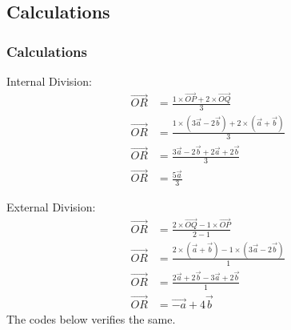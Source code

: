 \documentclass{beamer}
\theoremstyle{remark}
\numberwithin{equation}{section}
\begin{document}
	\subsection{Calculations}
	\begin{frame}
		\frametitle{Calculations}
		Internal Division:
		\begin{align}
			\overrightarrow{OR} &= \frac{1 \times \overrightarrow{OP} + 2 \times \overrightarrow{OQ}}{3} \\
			\overrightarrow{OR} &= \frac{1 \times (3\overrightarrow{a} - 2\overrightarrow{b}) + 2 \times (\overrightarrow{a} + \overrightarrow{b})}{3} \\
			\overrightarrow{OR} &= \frac{3\overrightarrow{a} - 2\overrightarrow{b} + 2\overrightarrow{a} + 2\overrightarrow{b}}{3} \\
			\overrightarrow{OR} &= \frac{5\overrightarrow{a}}{3}
		\end{align}
	\end{frame}
	\begin{frame}
		External Division:
		\begin{align}
			\overrightarrow{OR} &= \frac{2 \times \overrightarrow{OQ} - 1 \times \overrightarrow{OP}}{2 - 1} \\
			\overrightarrow{OR} &= \frac{2 \times (\overrightarrow{a} + \overrightarrow{b}) - 1 \times (3\overrightarrow{a} - 2\overrightarrow{b})}{1} \\
			\overrightarrow{OR} &= \frac{2\overrightarrow{a} + 2\overrightarrow{b} - 3\overrightarrow{a} + 2\overrightarrow{b}}{1} \\
			\overrightarrow{OR} &= \overrightarrow{-a} + 4\overrightarrow{b}
		\end{align}
		The codes below verifies the same.
	\end{frame}
	
\end{document}
